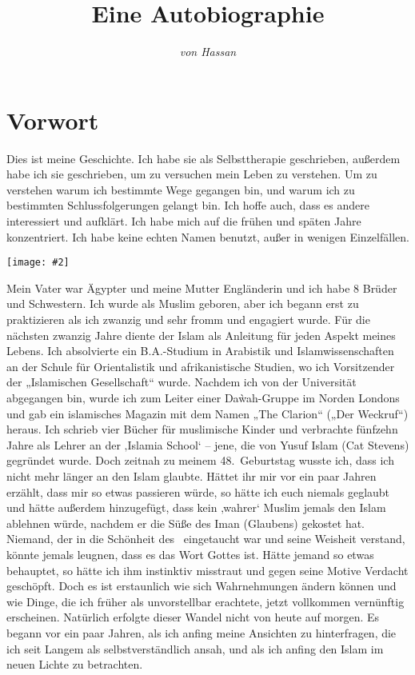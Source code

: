 \documentclass[12pt]{memoir}
\title{Eine Autobiographie}
\author{\emph{von Hassan}}
\date{}
\newcommand{\img}[3]{\begin{center}%
\texttt{[image: \#2]}\\{\small\em#3}%
\end{center}}
\begin{document}
\frontmatter

\maketitle
\thispagestyle{empty}
\cleardoublepage

\setcounter{page}{1}
\tableofcontents

\chapter{Vorwort}

Dies ist meine Geschichte. Ich habe sie als Selbsttherapie geschrieben,
außerdem habe ich sie geschrieben, um zu versuchen mein Leben zu verstehen.
Um zu verstehen warum ich bestimmte Wege gegangen bin,
und warum ich zu bestimmten Schlussfolgerungen gelangt bin.
Ich hoffe auch, dass es andere interessiert und aufklärt.
Ich habe mich auf die frühen und späten Jahre konzentriert.
Ich habe keine echten Namen benutzt, außer in wenigen Einzelfällen.

\img{scale=0.1}{Tunis_Hassan.jpg}{}

Mein Vater war Ägypter und meine Mutter Engländerin
und ich habe 8 Brüder und Schwestern.
Ich wurde als Muslim geboren, aber ich begann erst zu praktizieren
als ich zwanzig und sehr fromm und engagiert wurde.
Für die nächsten zwanzig Jahre diente der Islam als Anleitung
für jeden Aspekt meines Lebens.
Ich absolvierte ein B.A.-Studium in Arabistik und Islamwissenschaften
an der Schule für Orientalistik und afrikanistische Studien,
wo ich Vorsitzender der „Islamischen Gesellschaft“ wurde.
Nachdem ich von der Universität abgegangen bin,
wurde ich zum Leiter einer Da\`wah-Gruppe im Norden Londons
und gab ein islamisches Magazin mit dem Namen
„The Clarion“ („Der Weckruf“) heraus.
Ich schrieb vier Bücher für muslimische Kinder
und verbrachte fünfzehn Jahre als Lehrer an der ‚Islamia School‘ –
jene, die von Yusuf Islam (Cat Stevens) gegründet wurde.
Doch zeitnah zu meinem 48.\ Geburtstag wusste ich,
dass ich nicht mehr länger an den Islam glaubte.
Hättet ihr mir vor ein paar Jahren erzählt,
dass mir so etwas passieren würde,
so hätte ich euch niemals geglaubt und hätte außerdem hinzugefügt,
dass kein ‚wahrer‘ Muslim jemals den Islam ablehnen würde,
nachdem er die Süße des Iman (Glaubens) gekostet hat.
Niemand, der in die Schönheit des \Quran\ eingetaucht war
und seine Weisheit verstand, könnte jemals leugnen,
dass es das Wort Gottes ist. Hätte jemand so etwas behauptet,
so hätte ich ihm instinktiv misstraut
und gegen seine Motive Verdacht geschöpft.
Doch es ist erstaunlich wie sich Wahrnehmungen ändern können und wie Dinge,
die ich früher als unvorstellbar erachtete,
jetzt vollkommen vernünftig erscheinen.
Natürlich erfolgte dieser Wandel nicht von heute auf morgen.
Es begann vor ein paar Jahren,
als ich anfing meine Ansichten zu hinterfragen,
die ich seit Langem als selbstverständlich ansah,
und als ich anfing den Islam im neuen Lichte zu betrachten.
\end{document}

